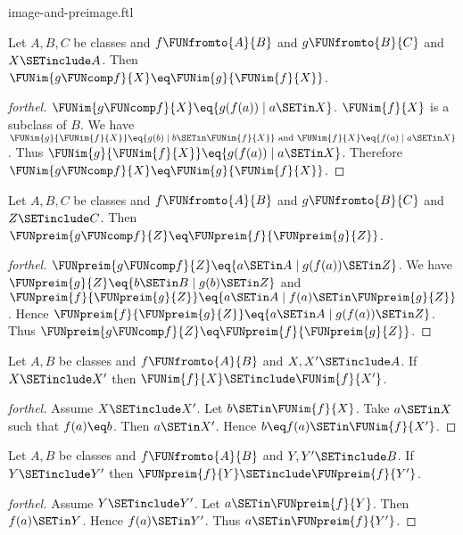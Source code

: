 \documentclass{naproche-library}
\begin{document}
\begin{smodule}[title=Computation Laws for Images and Preimages]{image-and-preimage.ftl}
\begin{proposition}[forthel,id=FOUNDATIONS_07_5628919411638272]
  Let $A, B, C$ be classes and $f \FUNfromto{A}{B}$ and $g \FUNfromto{B}{C}$ and $X \SETinclude A$.
  Then $\FUNim{g \FUNcomp f}{X} \eq \FUNim{g}{\FUNim{f}{X}}$.
\end{proposition}
\begin{proof}[forthel]
  $\FUNim{g \FUNcomp f}{X} \eq \{ g(f(a)) \mid a \SETin X \}$.
  $\FUNim{f}{X}$ is a subclass of $B$.
  We have $\FUNim{g}{\FUNim{f}{X}} \eq \{ g(b) \mid b \SETin \FUNim{f}{X} \}\text{ and }\FUNim{f}{X} \eq \{ f(a) \mid a \SETin X \}$.
  Thus $\FUNim{g}{\FUNim{f}{X}} \eq \{ g(f(a)) \mid a \SETin X \}$.
  Therefore $\FUNim{g \FUNcomp f}{X} \eq \FUNim{g}{\FUNim{f}{X}}$.
\end{proof}

\begin{proposition}[forthel,id=FOUNDATIONS_07_6824917886566400]
  Let $A, B, C$ be classes and $f \FUNfromto{A}{B}$ and $g \FUNfromto{B}{C}$ and $Z \SETinclude C$.
  Then $\FUNpreim{g \FUNcomp f}{Z} \eq \FUNpreim{f}{\FUNpreim{g}{Z}}$.
\end{proposition}
\begin{proof}[forthel]
  $\FUNpreim{g \FUNcomp f}{Z} \eq \{ a \SETin A \mid g(f(a)) \SETin Z \}$.
  We have $\FUNpreim{g}{Z} \eq \{ b \SETin B \mid g(b) \SETin Z \}$ and $\FUNpreim{f}{\FUNpreim{g}{Z}} \eq \{ a \SETin A \mid f(a) \SETin \FUNpreim{g}{Z} \}$.
  Hence $\FUNpreim{f}{\FUNpreim{g}{Z}} \eq \{ a \SETin A \mid g(f(a)) \SETin Z \}$.
  Thus $\FUNpreim{g \FUNcomp f}{Z} \eq \FUNpreim{f}{\FUNpreim{g}{Z}}$.
\end{proof}

\begin{proposition}[forthel,id=FOUNDATIONS_07_7396318576115712]
  Let $A, B$ be classes and $f \FUNfromto{A}{B}$ and $X, X' \SETinclude A$.
  If $X \SETinclude X'$ then $\FUNim{f}{X} \SETinclude \FUNim{f}{X'}$.
\end{proposition}
\begin{proof}[forthel]
  Assume $X \SETinclude X'$.
  Let $b \SETin \FUNim{f}{X}$.
  Take $a \SETin X$ such that $f(a) \eq b$.
  Then $a \SETin X'$.
  Hence $b \eq f(a) \SETin \FUNim{f}{X'}$.
\end{proof}

\begin{proposition}[forthel,id=FOUNDATIONS_07_8376448628817920]
  Let $A, B$ be classes and $f \FUNfromto{A}{B}$ and $Y, Y' \SETinclude B$.
  If $Y \SETinclude Y'$ then $\FUNpreim{f}{Y} \SETinclude \FUNpreim{f}{Y'}$.
\end{proposition}
\begin{proof}[forthel]
  Assume $Y \SETinclude Y'$.
  Let $a \SETin \FUNpreim{f}{Y}$.
  Then $f(a) \SETin Y$.
  Hence $f(a) \SETin Y'$.
  Thus $a \SETin \FUNpreim{f}{Y'}$.
\end{proof}


\end{smodule}
\end{document}
